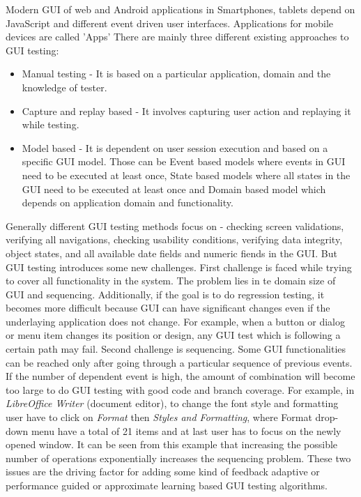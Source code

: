 \documentclass[authoryear,preprint, twocolumn]{sigplanconf}
\begin{document}
Modern GUI of web and Android applications in Smartphones, tablets depend on JavaScript and different event driven user interfaces. Applications for mobile devices are called 'Apps'
\newline There are mainly three different existing approaches to GUI testing:
\begin{itemize}
	\item Manual testing - It is based on a particular application, domain and the knowledge of tester.
	\item Capture and replay based - It involves capturing user action and replaying it while testing.
	\item Model based - It is dependent on user session execution and based on a specific GUI model. Those can be Event based models where events in GUI need to be executed at least once, State based models where all states in the GUI need to be executed at least once and Domain based model which depends on application domain and functionality.
\end{itemize}
Generally different GUI testing methods focus on - checking screen validations, verifying all navigations, checking usability conditions, verifying data integrity, object states, and all available date fields and numeric fiends in the GUI.
\newline But GUI testing introduces some new challenges. First challenge is faced while trying to cover all functionality in the system. The problem lies in te domain size of GUI and sequencing. Additionally, if the goal is to do regression testing, it becomes more difficult because GUI can have significant changes even if the  underlaying application does not change. For example, when a button or dialog or menu item changes its position or design, any GUI test which is following a certain path may fail. Second challenge is sequencing. Some GUI functionalities can be reached only after going through a particular sequence of previous events. If the number of dependent event is high, the amount of combination will become too large to do GUI testing with good code and branch coverage. For example, in \emph{LibreOffice Writer} (document editor), to change the font style and formatting user have to click on \emph{Format} then \emph{Styles and Formatting}, where Format drop-down menu have a total of 21 items and at last user has to focus on the newly opened window. It can be seen from this example that increasing the possible number of operations exponentially increases the sequencing problem.
\newline These two issues are the driving factor for adding some kind of feedback adaptive or performance guided or approximate learning based GUI testing algorithms. 
\end{document}
